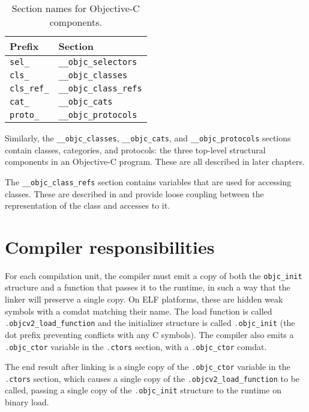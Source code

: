 \documentclass[a4paper]{report}
\newcommand{\ccode}[1]{\lstinline[language={C}]{#1}}
\begin{document}
\begin{table}
	\begin{center}
		\begin{tabular}{l|l}
			Prefix & Section \\\hline
			\ccode{sel_} & \ccode{__objc_selectors}\\
			\ccode{cls_} & \ccode{__objc_classes}\\
			\ccode{cls_ref_} & \ccode{__objc_class_refs}\\
			\ccode{cat_} & \ccode{__objc_cats}\\
			\ccode{proto_} & \ccode{__objc_protocols}\\
		\end{tabular}
		\caption{\label{tab:sections}Section names for Objective-C components.}
	\end{center}
\end{table}

Similarly, the \ccode{__objc_classes}, \ccode{__objc_cats}, and \ccode{__objc_protocols} sections contain classes, categories, and protocols: the three top-level structural components in an Objective-C program.
These are all described in later chapters.

The \ccode{__objc_class_refs} section contains variables that are used for accessing classes.
These are described in  and provide loose coupling between the representation of the class and accesses to it.

\section{Compiler responsibilities}

For each compilation unit, the compiler must emit a copy of both the \ccode{objc_init} structure and a function that passes it to the runtime, in such a way that the linker will preserve a single copy.
On ELF platforms, these are hidden weak symbols with a comdat matching their name.
The load function is called \ccode{.objcv2_load_function} and the initializer structure is called \ccode{.objc_init} (the dot prefix preventing conflicts with any C symbols).
The compiler also emits a \ccode{.objc_ctor} variable in the \ccode{.ctors} section, with a \ccode{.objc_ctor} comdat.

The end result after linking is a single copy of the \ccode{.objc_ctor} variable in the \ccode{.ctors} section, which causes a single copy of the  \ccode{.objcv2_load_function} to be called, passing a single copy of the \ccode{.objc_init} structure to the runtime on binary load.
\end{document}
